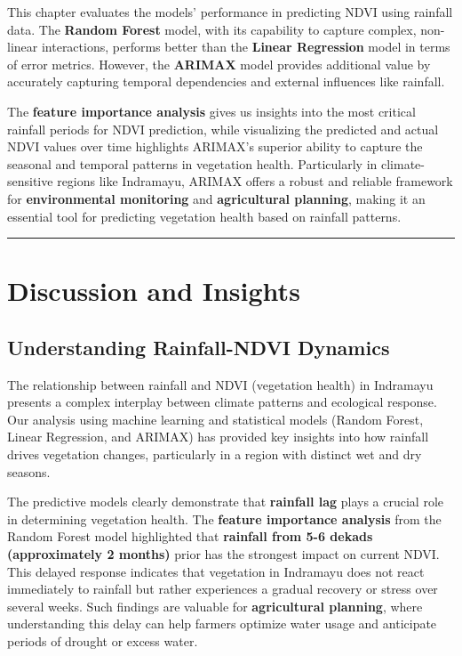 \documentclass[
]{article}
\begin{document}
This chapter evaluates the models' performance in predicting NDVI using
rainfall data. The \textbf{Random Forest} model, with its capability to
capture complex, non-linear interactions, performs better than the
\textbf{Linear Regression} model in terms of error metrics. However, the
\textbf{ARIMAX} model provides additional value by accurately capturing
temporal dependencies and external influences like rainfall.

The \textbf{feature importance analysis} gives us insights into the most
critical rainfall periods for NDVI prediction, while visualizing the
predicted and actual NDVI values over time highlights ARIMAX's superior
ability to capture the seasonal and temporal patterns in vegetation
health. Particularly in climate-sensitive regions like Indramayu, ARIMAX
offers a robust and reliable framework for \textbf{environmental
monitoring} and \textbf{agricultural planning}, making it an essential
tool for predicting vegetation health based on rainfall patterns.

\begin{center}\rule{0.5\linewidth}{0.5pt}\end{center}

\section{Discussion and Insights}\label{discussion-and-insights}

\subsection{Understanding Rainfall-NDVI
Dynamics}\label{understanding-rainfall-ndvi-dynamics}

The relationship between rainfall and NDVI (vegetation health) in
Indramayu presents a complex interplay between climate patterns and
ecological response. Our analysis using machine learning and statistical
models (Random Forest, Linear Regression, and ARIMAX) has provided key
insights into how rainfall drives vegetation changes, particularly in a
region with distinct wet and dry seasons.

The predictive models clearly demonstrate that \textbf{rainfall lag}
plays a crucial role in determining vegetation health. The
\textbf{feature importance analysis} from the Random Forest model
highlighted that \textbf{rainfall from 5-6 dekads (approximately 2
months)} prior has the strongest impact on current NDVI. This delayed
response indicates that vegetation in Indramayu does not react
immediately to rainfall but rather experiences a gradual recovery or
stress over several weeks. Such findings are valuable for
\textbf{agricultural planning}, where understanding this delay can help
farmers optimize water usage and anticipate periods of drought or excess
water.
\end{document}
